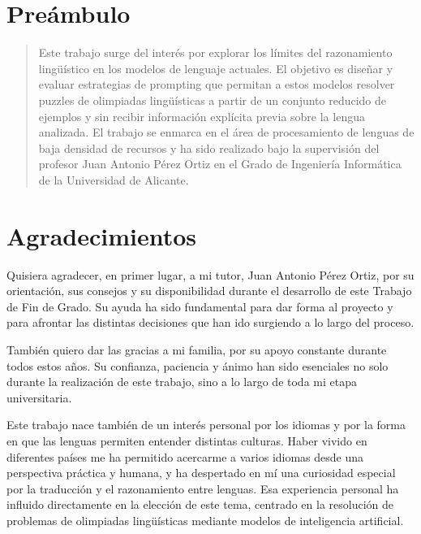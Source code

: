 
\chapter*{Preámbulo}
\thispagestyle{empty}
\begin{quote}
Este trabajo surge del interés por explorar los límites del razonamiento lingüístico en los modelos de lenguaje actuales. El objetivo es diseñar y evaluar estrategias de prompting que permitan a estos modelos resolver puzzles de olimpiadas lingüísticas a partir de un conjunto reducido de ejemplos y sin recibir información explícita previa sobre la lengua analizada. El trabajo se enmarca en el área de procesamiento de lenguas de baja densidad de recursos y ha sido realizado bajo la supervisión del profesor Juan Antonio Pérez Ortiz en el Grado de Ingeniería Informática de la Universidad de Alicante.
\end{quote}


\cleardoublepage %
\chapter*{Agradecimientos
}

\thispagestyle{empty}
\vspace{1cm}

Quisiera agradecer, en primer lugar, a mi tutor, Juan Antonio Pérez Ortiz, por su orientación, sus consejos y su disponibilidad durante el desarrollo de este Trabajo de Fin de Grado. Su ayuda ha sido fundamental para dar forma al proyecto y para afrontar las distintas decisiones que han ido surgiendo a lo largo del proceso.

También quiero dar las gracias a mi familia, por su apoyo constante durante todos estos años. Su confianza, paciencia y ánimo han sido esenciales no solo durante la realización de este trabajo, sino a lo largo de toda mi etapa universitaria.

Este trabajo nace también de un interés personal por los idiomas y por la forma en que las lenguas permiten entender distintas culturas. Haber vivido en diferentes países me ha permitido acercarme a varios idiomas desde una perspectiva práctica y humana, y ha despertado en mí una curiosidad especial por la traducción y el razonamiento entre lenguas. Esa experiencia personal ha influido directamente en la elección de este tema, centrado en la resolución de problemas de olimpiadas lingüísticas mediante modelos de inteligencia artificial.

